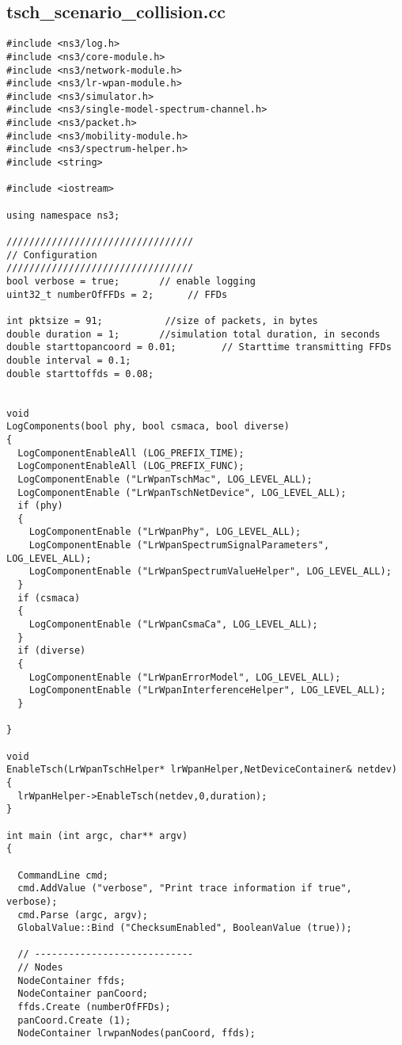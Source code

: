 \subsection{tsch\_scenario\_collision.cc}
\begin{lstlisting}[frame=single]
#include <ns3/log.h>
#include <ns3/core-module.h>
#include <ns3/network-module.h>
#include <ns3/lr-wpan-module.h>
#include <ns3/simulator.h>
#include <ns3/single-model-spectrum-channel.h>
#include <ns3/packet.h>
#include <ns3/mobility-module.h>
#include <ns3/spectrum-helper.h>
#include <string>

#include <iostream>

using namespace ns3;

/////////////////////////////////
// Configuration
/////////////////////////////////
bool verbose = true;       // enable logging
uint32_t numberOfFFDs = 2;      // FFDs

int pktsize = 91;           //size of packets, in bytes
double duration = 1;       //simulation total duration, in seconds
double starttopancoord = 0.01;        // Starttime transmitting FFDs
double interval = 0.1;
double starttoffds = 0.08;


void
LogComponents(bool phy, bool csmaca, bool diverse)
{
  LogComponentEnableAll (LOG_PREFIX_TIME);
  LogComponentEnableAll (LOG_PREFIX_FUNC);
  LogComponentEnable ("LrWpanTschMac", LOG_LEVEL_ALL);
  LogComponentEnable ("LrWpanTschNetDevice", LOG_LEVEL_ALL);
  if (phy)
  {
    LogComponentEnable ("LrWpanPhy", LOG_LEVEL_ALL);
    LogComponentEnable ("LrWpanSpectrumSignalParameters", LOG_LEVEL_ALL);
    LogComponentEnable ("LrWpanSpectrumValueHelper", LOG_LEVEL_ALL);
  }
  if (csmaca)
  {
    LogComponentEnable ("LrWpanCsmaCa", LOG_LEVEL_ALL);
  }
  if (diverse)
  {
    LogComponentEnable ("LrWpanErrorModel", LOG_LEVEL_ALL);
    LogComponentEnable ("LrWpanInterferenceHelper", LOG_LEVEL_ALL);
  }

}

void
EnableTsch(LrWpanTschHelper* lrWpanHelper,NetDeviceContainer& netdev)
{
  lrWpanHelper->EnableTsch(netdev,0,duration);
}

int main (int argc, char** argv)
{

  CommandLine cmd;
  cmd.AddValue ("verbose", "Print trace information if true", verbose);
  cmd.Parse (argc, argv);
  GlobalValue::Bind ("ChecksumEnabled", BooleanValue (true));

  // ----------------------------
  // Nodes
  NodeContainer ffds;
  NodeContainer panCoord;
  ffds.Create (numberOfFFDs);
  panCoord.Create (1);
  NodeContainer lrwpanNodes(panCoord, ffds);


\end{lstlisting}
